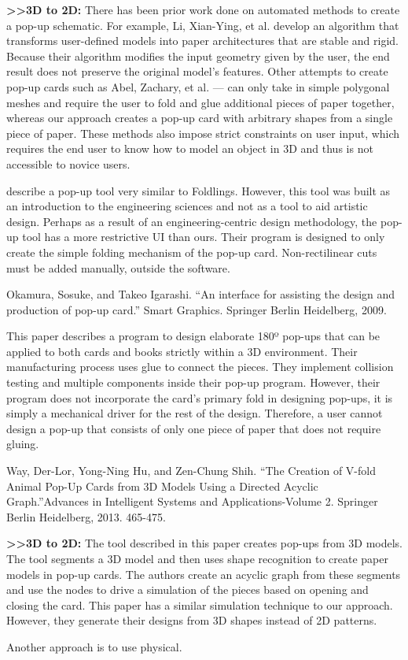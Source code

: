 \textbf{\textgreater{}\textgreater{}3D to 2D:} There has been prior work
done on automated methods to create a pop-up schematic. For example, Li,
Xian-Ying, et al. develop an algorithm that transforms user-defined
models into paper architectures that are stable and rigid. Because their
algorithm modifies the input geometry given by the user, the end result
does not preserve the original model's features. Other attempts to
create pop-up cards such as Abel, Zachary, et al. --- can only take in
simple polygonal meshes and require the user to fold and glue additional
pieces of paper together, whereas our approach creates a pop-up card
with arbitrary shapes from a single piece of paper. These methods also
impose strict constraints on user input, which requires the end user to
know how to model an object in 3D and thus is not accessible to novice
users.

\citet{hendrix2006computer} describe a pop-up tool very similar to
Foldlings. However, this tool was built as an introduction to the
engineering sciences and not as a tool to aid artistic design. Perhaps
as a result of an engineering-centric design methodology, the pop-up
tool has a more restrictive UI than ours. Their program is designed to
only create the simple folding mechanism of the pop-up card.
Non-rectilinear cuts must be added manually, outside the software.

Okamura, Sosuke, and Takeo Igarashi. ``An interface for assisting the
design and production of pop-up card.'' Smart Graphics. Springer Berlin
Heidelberg, 2009. \citet{okamura2009interface}

This paper describes a program to design elaborate 180º pop-ups that can
be applied to both cards and books strictly within a 3D environment.
Their manufacturing process uses glue to connect the pieces. They
implement collision testing and multiple components inside their pop-up
program. However, their program does not incorporate the card's primary
fold in designing pop-ups, it is simply a mechanical driver for the rest
of the design. Therefore, a user cannot design a pop-up that consists of
only one piece of paper that does not require gluing.

Way, Der-Lor, Yong-Ning Hu, and Zen-Chung Shih. ``The Creation of V-fold
Animal Pop-Up Cards from 3D Models Using a Directed Acyclic
Graph.''Advances in Intelligent Systems and Applications-Volume 2.
Springer Berlin Heidelberg, 2013. 465-475. \citet{way2013creation}

\textbf{\textgreater{}\textgreater{}3D to 2D:} The tool described in
this paper creates pop-ups from 3D models. The tool segments a 3D model
and then uses shape recognition to create paper models in pop-up cards.
The authors create an acyclic graph from these segments and use the
nodes to drive a simulation of the pieces based on opening and closing
the card. This paper has a similar simulation technique to our approach.
However, they generate their designs from 3D shapes instead of 2D
patterns.

Another approach is to use physical.
